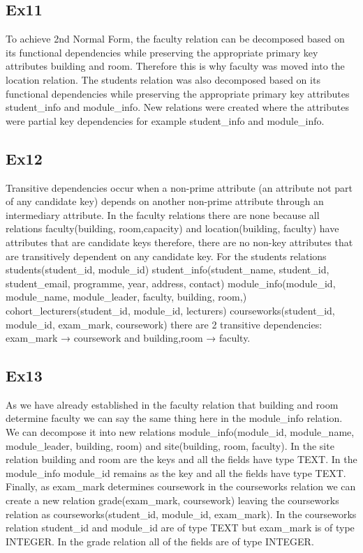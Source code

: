 \documentclass[12pt]{article}
\begin{document}
{{\subsection{Ex11}
To achieve 2nd Normal Form, the faculty relation can be decomposed based on its functional dependencies while preserving the appropriate primary key attributes building and room. Therefore this is why faculty was moved into the location relation. The students relation was also decomposed based on its functional dependencies while preserving the appropriate primary key attributes student\_info and module\_info. New relations were created where the attributes were partial key dependencies for example student\_info and module\_info.
\subsection{Ex12}
Transitive dependencies occur when a non-prime attribute (an attribute not part of any candidate key) depends on another non-prime attribute through an intermediary attribute. In the faculty relations there are none because all relations faculty(building, room,capacity) and location(building, faculty) have attributes that are candidate keys therefore, there are no non-key attributes that are transitively dependent on any candidate key. For the students relations students(student\_id, module\_id) student\_info(student\_name, student\_id, student\_email, programme, year, address, contact) module\_info(module\_id, module\_name, module\_leader, faculty, building, room,) cohort\_lecturers(student\_id, module\_id, lecturers) courseworks(student\_id, module\_id, exam\_mark, coursework) there are 2 transitive dependencies: exam\_mark → coursework and building,room → faculty.
\subsection{Ex13}
As we have already established in the faculty relation that building and room determine faculty we can say the same thing here in the module\_info relation. We can decompose it into new relations module\_info(module\_id, module\_name, module\_leader, building, room) and site(building, room, faculty). In the site relation building and room are the keys and all the fields have type TEXT. In the module\_info module\_id remains as the key and all the fields have type TEXT. Finally, as exam\_mark determines coursework in the courseworks relation we can create a new relation grade(exam\_mark, coursework) leaving the courseworks relation as courseworks(student\_id, module\_id, exam\_mark). In the courseworks relation student\_id and module\_id are of type TEXT but exam\_mark is of type INTEGER. In the grade relation all of the fields are of type INTEGER.
}}
\end{document}
